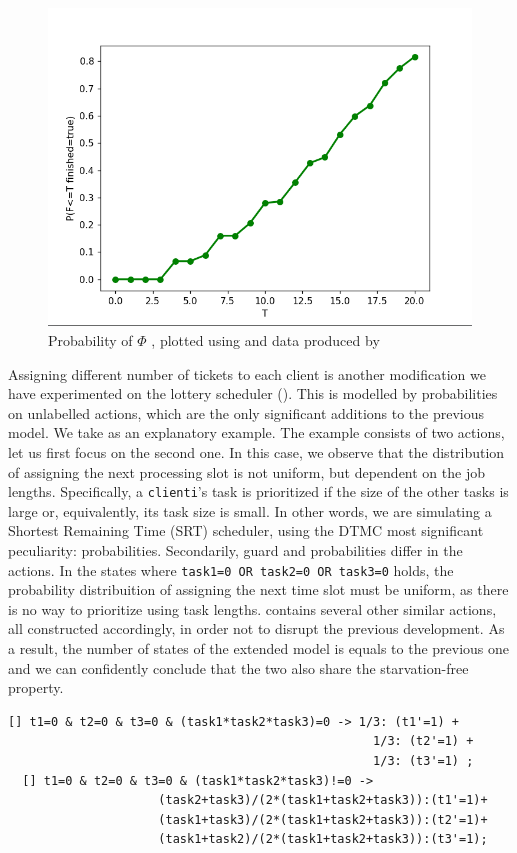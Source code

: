\documentclass{report}
\begin{document}
\begin{figure}[h]
  \begin{center}
    \includegraphics[width=.7\textwidth]{./code/results/b11e.png}
    \caption{Probability of $\Phi$ , plotted using  and data  produced by }
    \label{fig:b11e}
  \end{center}
\end{figure}

Assigning different number of tickets to each client is another modification we have experimented on the lottery scheduler (). This is modelled by probabilities on unlabelled actions, which are the only significant additions to the previous model. We take  as an explanatory example. The example consists of two actions, let us first focus on the second one. In this case, we observe that the distribution of assigning the next processing slot is not uniform, but dependent on the job lengths. Specifically, a \texttt{clienti}'s task is prioritized if the size of the other tasks is large or, equivalently, its task size is small. In other words, we are simulating a Shortest Remaining Time (SRT) scheduler, using the DTMC most significant peculiarity: probabilities. Secondarily, guard and probabilities differ in the  actions. In the states where \texttt{task1=0 OR task2=0 OR task3=0} holds, the probability distribuition of assigning the next time slot must be uniform, as there is no way to prioritize using task lengths.  contains several other similar actions, all constructed accordingly, in order not to disrupt the previous development. As a result, the number of states of the extended model is equals to the previous one and we can confidently conclude that the two also share the starvation-free property. 

\begin{lstlisting}[caption=Addition to \Cref{mod:LS-b11a} modelling different number of tickets per client,label=lst:b12a]
  [] t1=0 & t2=0 & t3=0 & (task1*task2*task3)=0 -> 1/3: (t1'=1) + 
                                                   1/3: (t2'=1) + 
                                                   1/3: (t3'=1) ;
  [] t1=0 & t2=0 & t3=0 & (task1*task2*task3)!=0 ->
                     (task2+task3)/(2*(task1+task2+task3)):(t1'=1)+ 
                     (task1+task3)/(2*(task1+task2+task3)):(t2'=1)+
                     (task1+task2)/(2*(task1+task2+task3)):(t3'=1);
\end{lstlisting}
\end{document}

